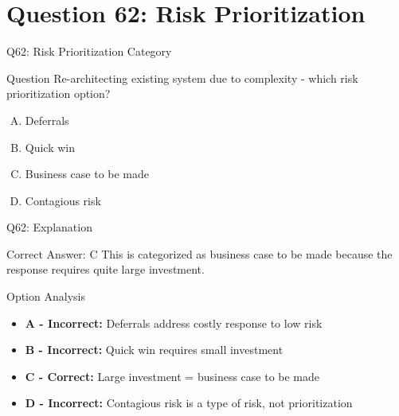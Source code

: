 \documentclass{beamer}
\begin{document}
	\section{Question 62: Risk Prioritization}
	
	\begin{frame}{Q62: Risk Prioritization Category}
		\begin{block}{Question}
			Re-architecting existing system due to complexity - which risk prioritization option?
		\end{block}
		\begin{enumerate}[(A)]
			\item Deferrals
			\item Quick win
			\item Business case to be made
			\item Contagious risk
		\end{enumerate}
	\end{frame}
	
	\begin{frame}{Q62: Explanation}
		\begin{block}{Correct Answer: C}
			This is categorized as business case to be made because the response requires quite large investment.
		\end{block}
		\begin{block}{Option Analysis}
			\begin{itemize}
				\item \textbf{A - Incorrect:} Deferrals address costly response to low risk
				\item \textbf{B - Incorrect:} Quick win requires small investment
				\item \textbf{C - Correct:} Large investment = business case to be made
				\item \textbf{D - Incorrect:} Contagious risk is a type of risk, not prioritization
			\end{itemize}
		\end{block}
	\end{frame}
	
	
	
\end{document}
